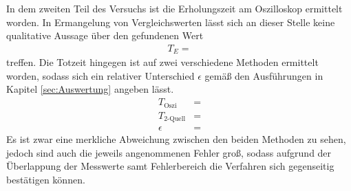 In dem zweiten Teil des Versuchs ist die Erholungszeit am Oszilloskop ermittelt worden. In Ermangelung von Vergleichswerten lässt sich an dieser Stelle keine qualitative Aussage über den gefundenen Wert
\begin{align*}
  T_E = 
\end{align*}
treffen. Die Totzeit hingegen ist auf zwei verschiedene Methoden ermittelt worden, sodass sich ein relativer Unterschied $\epsilon$ gemäß den Ausführungen in Kapitel \ref{sec:Auswertung} angeben lässt.
\begin{align*}
  T_\text{Oszi}   &=  \\
  T_\text{2-Quell} &=  \\
  \epsilon &= 
\end{align*}
Es ist zwar eine merkliche Abweichung zwischen den beiden Methoden zu sehen, jedoch sind auch die jeweils angenommenen Fehler groß, sodass aufgrund der Überlappung der Messwerte samt Fehlerbereich die Verfahren sich gegenseitig bestätigen können.

